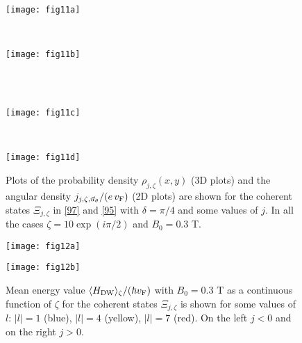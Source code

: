 \documentclass[aps,showpacs,showkeys]{revtex4}
\begin{document}
\begin{figure}[htb]
	\centering
	\begin{minipage}[b]{0.33\textwidth}
		\texttt{[image: fig11a]}\\
		\label{fig:jtheta1N_zl_1}
	\end{minipage}
\hspace{3cm}
	~ %
	\begin{minipage}[b]{0.33\textwidth}
		\texttt{[image: fig11b]}\\
		\label{fig:jtheta1N_zl_2}
	\end{minipage}
	\\  [2ex]
	~ %
	\begin{minipage}[b]{0.33\textwidth}
		\texttt{[image: fig11c]}\\
		\label{fig:jtheta1N_zl_3}
	\end{minipage}
\hspace{3cm}
	~ %
	\begin{minipage}[b]{0.33\textwidth}
		\texttt{[image: fig11d]}\\
		\label{fig:H1N_z}
	\end{minipage}
	\caption{\label{fig:rho1N_z}Plots of the probability density $\rho_{j,\zeta}(x,y)$ (3D plots) and the angular density 
	$j_{j,\zeta,\vec{u}_\theta}/(e\,v_{\rm F})$ (2D plots) are shown for the coherent states $\Xi_{j,\zeta}$ in \eqref{97} and \eqref{95} with $\delta=\pi/4$ and some values of $j$. In all the cases $\zeta=10\exp(i\pi/2)$ and $B_{0}=0.3$ T.}
\end{figure}


\begin{figure}[htb]
	\centering
	\begin{minipage}[b]{0.34\textwidth}
		\texttt{[image: fig12a]}
		\label{fig:H1P_z}
	\end{minipage}
\hspace{3cm}
	\begin{minipage}[b]{0.34\textwidth}
		\texttt{[image: fig12b]}
		\label{fig:H1N_z}
	\end{minipage}
	\caption{\label{fig:H_z}Mean energy value $\langle H_{\rm DW}\rangle_\zeta/(\hbar v_{\rm F})$ with 
	$B_{0}=0.3$ T as a continuous function of $\zeta$ for the coherent states $\Xi_{j,\zeta}$ is shown for 
	some values of $l$: $\vert l\vert=1$ (blue), $\vert l\vert=4$ (yellow), $\vert l\vert=7$ (red).
	On the left $j<0$ and on the right $j>0$.}
\end{figure}
\end{document}
